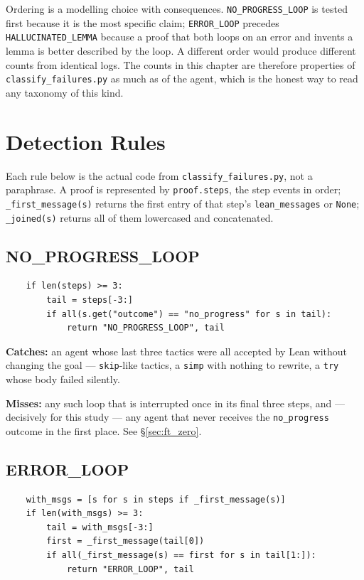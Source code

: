 Ordering is a modelling choice with consequences. \texttt{NO\_PROGRESS\_LOOP}
is tested first because it is the most specific claim; \texttt{ERROR\_LOOP}
precedes \texttt{HALLUCINATED\_LEMMA} because a proof that both loops on an
error and invents a lemma is better described by the loop. A different order
would produce different counts from identical logs. The counts in this chapter
are therefore properties of \texttt{classify\_failures.py} as much as of the
agent, which is the honest way to read any taxonomy of this kind.

\section{Detection Rules}
\label{sec:ft_rules}

Each rule below is the actual code from \texttt{classify\_failures.py}, not a
paraphrase. A proof is represented by \texttt{proof.steps}, the step events in
order; \texttt{\_first\_message(s)} returns the first entry of that step's
\texttt{lean\_messages} or \texttt{None}; \texttt{\_joined(s)} returns all of
them lowercased and concatenated.

\subsection{NO\_PROGRESS\_LOOP}

\begin{verbatim}
    if len(steps) >= 3:
        tail = steps[-3:]
        if all(s.get("outcome") == "no_progress" for s in tail):
            return "NO_PROGRESS_LOOP", tail
\end{verbatim}

\noindent
\textbf{Catches:} an agent whose last three tactics were all accepted by Lean
without changing the goal --- \texttt{skip}-like tactics, a \texttt{simp} with
nothing to rewrite, a \texttt{try} whose body failed silently.

\noindent
\textbf{Misses:} any such loop that is interrupted once in its final three
steps, and --- decisively for this study --- any agent that never receives the
\texttt{no\_progress} outcome in the first place. See \S\ref{sec:ft_zero}.

\subsection{ERROR\_LOOP}

\begin{verbatim}
    with_msgs = [s for s in steps if _first_message(s)]
    if len(with_msgs) >= 3:
        tail = with_msgs[-3:]
        first = _first_message(tail[0])
        if all(_first_message(s) == first for s in tail[1:]):
            return "ERROR_LOOP", tail
\end{verbatim}

